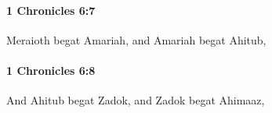 		\paragraph{1 Chronicles 6:7} %
			\label{1CHRONICLES-6-7}

			Meraioth begat Amariah, and Amariah begat Ahitub,


		\paragraph{1 Chronicles 6:8} %
			\label{1CHRONICLES-6-8}

			And Ahitub begat Zadok, and Zadok begat Ahimaaz,


